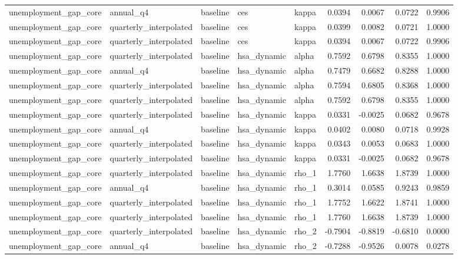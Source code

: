 \begin{tabular}{lllllrrrr}
unemployment\_gap\_core & annual\_q4 & baseline & ces & kappa & 0.0394 & 0.0067 & 0.0722 & 0.9906 \\
unemployment\_gap\_core & quarterly\_interpolated & baseline & ces & kappa & 0.0399 & 0.0082 & 0.0721 & 1.0000 \\
unemployment\_gap\_core & quarterly\_interpolated & baseline & ces & kappa & 0.0394 & 0.0067 & 0.0722 & 0.9906 \\
unemployment\_gap\_core & quarterly\_interpolated & baseline & hsa\_dynamic & alpha & 0.7592 & 0.6798 & 0.8355 & 1.0000 \\
unemployment\_gap\_core & annual\_q4 & baseline & hsa\_dynamic & alpha & 0.7479 & 0.6682 & 0.8288 & 1.0000 \\
unemployment\_gap\_core & quarterly\_interpolated & baseline & hsa\_dynamic & alpha & 0.7594 & 0.6805 & 0.8368 & 1.0000 \\
unemployment\_gap\_core & quarterly\_interpolated & baseline & hsa\_dynamic & alpha & 0.7592 & 0.6798 & 0.8355 & 1.0000 \\
unemployment\_gap\_core & quarterly\_interpolated & baseline & hsa\_dynamic & kappa & 0.0331 & -0.0025 & 0.0682 & 0.9678 \\
unemployment\_gap\_core & annual\_q4 & baseline & hsa\_dynamic & kappa & 0.0402 & 0.0080 & 0.0718 & 0.9928 \\
unemployment\_gap\_core & quarterly\_interpolated & baseline & hsa\_dynamic & kappa & 0.0343 & 0.0053 & 0.0683 & 1.0000 \\
unemployment\_gap\_core & quarterly\_interpolated & baseline & hsa\_dynamic & kappa & 0.0331 & -0.0025 & 0.0682 & 0.9678 \\
unemployment\_gap\_core & quarterly\_interpolated & baseline & hsa\_dynamic & rho\_1 & 1.7760 & 1.6638 & 1.8739 & 1.0000 \\
unemployment\_gap\_core & annual\_q4 & baseline & hsa\_dynamic & rho\_1 & 0.3014 & 0.0585 & 0.9243 & 0.9859 \\
unemployment\_gap\_core & quarterly\_interpolated & baseline & hsa\_dynamic & rho\_1 & 1.7752 & 1.6622 & 1.8741 & 1.0000 \\
unemployment\_gap\_core & quarterly\_interpolated & baseline & hsa\_dynamic & rho\_1 & 1.7760 & 1.6638 & 1.8739 & 1.0000 \\
unemployment\_gap\_core & quarterly\_interpolated & baseline & hsa\_dynamic & rho\_2 & -0.7904 & -0.8819 & -0.6810 & 0.0000 \\
unemployment\_gap\_core & annual\_q4 & baseline & hsa\_dynamic & rho\_2 & -0.7288 & -0.9526 & 0.0078 & 0.0278 \\

\end{tabular}
